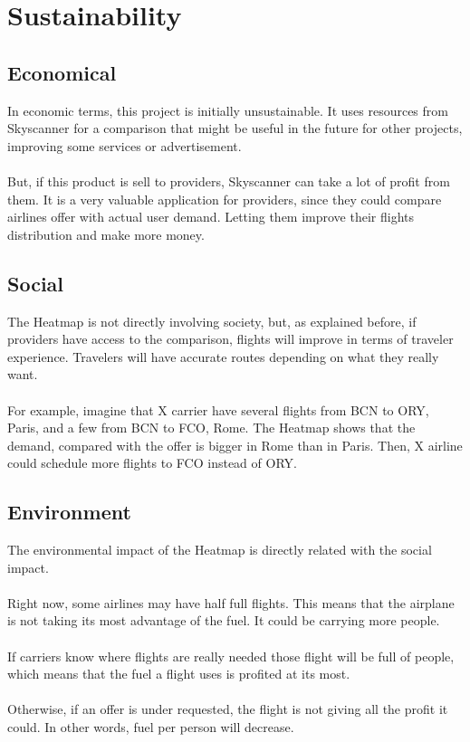 \section{Sustainability}

\subsection{Economical}

In economic terms, this project is initially unsustainable. It uses resources from Skyscanner for a comparison that might be useful in the future for other projects, improving some services or advertisement.
\\\\
But, if this product is sell to providers, Skyscanner can take a lot of profit from them. It is a very valuable application for providers, since they could compare airlines offer with actual user demand. Letting them improve their flights distribution and make more money.

\subsection{Social}

The Heatmap is not directly involving society, but, as explained before, if providers have access to the comparison, flights will improve in terms of traveler experience. Travelers will have accurate routes depending on what they really want.
\\\\
For example, imagine that X carrier have several flights from BCN to ORY, Paris, and a few from BCN to FCO, Rome. The Heatmap shows that the demand, compared with the offer is bigger in Rome than in Paris. Then, X airline could schedule more flights to FCO instead of ORY.

\subsection{Environment}

The environmental impact of the Heatmap is directly related with the social impact.
\\\\
Right now, some airlines may have half full flights. This means that the airplane is not taking its most advantage of the fuel. It could be carrying more people.
\\\\
If carriers know where flights are really needed those flight will be full of people, which means that the fuel a flight uses is profited at its most.
\\\\
Otherwise, if an offer is under requested, the flight is not giving all the profit it could.
In other words, fuel per person will decrease.

